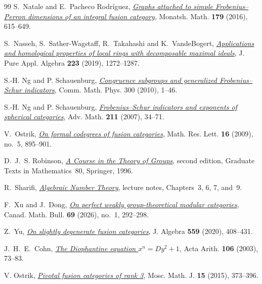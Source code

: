 \documentclass[11pt,a4paper]{article}
\numberwithin{equation}{section}
\theoremstyle{remark}
\begin{document}
\begin{thebibliography}{99}
S.~Natale and E.~Pacheco Rodr\'iguez,
\href{https://doi.org/10.1007/s00605-015-0734-7}{\emph{Graphs attached to simple Frobenius--Perron dimensions of
an integral fusion category}}, Monatsh. Math. \textbf{179} (2016), 615--649.

S.~Nasseh, S.~Sather-Wagstaff, R.~Takahashi and K.~VandeBogert,
\href{https://doi.org/10.1016/j.jpaa.2018.06.006}{\emph{Applications and homological properties of local rings with
decomposable maximal ideals}}, J. Pure Appl. Algebra \textbf{223}
(2019), 1272--1287.

S.-H. Ng and P. Schauenburg, \href{https://doi.org/10.1007/s00220-010-1096-6}{\emph{Congruence subgroups and generalized Frobenius--Schur indicators}}, Comm. Math. Phys. 300 (2010), 1--46.

S.-H. Ng and P. Schauenburg, \href{https://doi.org/10.1016/j.aim.2006.07.017}{\emph{Frobenius--Schur indicators and exponents of spherical categories}}, Adv. Math. \textbf{211} (2007), 34--71.

V.~Ostrik,
\href{https://doi.org/10.4310/MRL.2009.v16.n5.a11}{\emph{On formal codegrees of fusion categories}},
Math. Res. Lett. \textbf{16} (2009), no.~5, 895--901.

D.~J.~S. Robinson, \href{https://doi.org/10.1007/978-1-4419-8594-1}{\emph{A Course in the Theory of Groups}}, second edition, Graduate Texts in Mathematics~80, Springer, 1996.

R.~Sharifi,
\href{https://www.math.ucla.edu/~sharifi/algnum.pdf}{\emph{Algebraic Number Theory}}, lecture notes, Chapters~3, 6, 7, and~9.

F.~Xu and J.~Dong,
\href{https://doi.org/10.4153/S0008439525101197}{\emph{On perfect weakly group-theoretical modular categories}},
Canad. Math. Bull. \textbf{69} (2026), no.~1, 292--298.

Z.~Yu,
\href{https://doi.org/10.1016/j.jalgebra.2020.04.022}{\emph{On slightly degenerate fusion categories}},
J. Algebra \textbf{559} (2020), 408--431.

J.~H.~E.~Cohn,
\href{https://doi.org/10.4064/aa106-1-5}{\emph{The Diophantine
equation $x^n=Dy^2+1$}}, Acta Arith. \textbf{106} (2003), 73--83.

V. Ostrik, \href{https://doi.org/10.17323/1609-4514-2015-15-2-373-396}{\emph{Pivotal fusion categories of rank 3}}, Mosc. Math. J. \textbf{15} (2015), 373--396.


\end{thebibliography}
\end{document}
